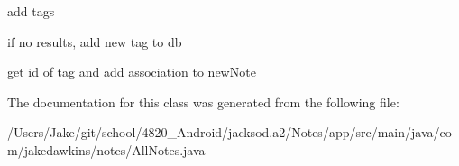 add tags

if no results, add new tag to db

get id of tag and add association to new\+Note 

The documentation for this class was generated from the following file\+:\begin{DoxyCompactItemize}
\item 
/\+Users/\+Jake/git/school/4820\+\_\+\+Android/jacksod.\+a2/\+Notes/app/src/main/java/com/jakedawkins/notes/All\+Notes.\+java\end{DoxyCompactItemize}
